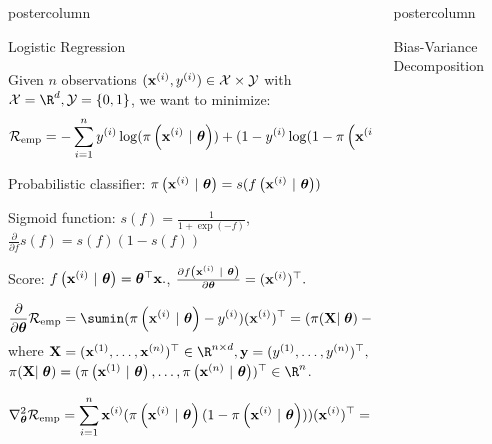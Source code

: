 \documentclass{beamer}
\newlength{\columnheight} %
\begin{document}
\begin{frame}[fragile]{}
\begin{columns}
	\begin{column}{.31\textwidth}
		\begin{beamercolorbox}[center]{postercolumn}
			\begin{minipage}{.98\textwidth}
				\parbox[t][\columnheight]{\textwidth}{

       \begin{myblock}{Logistic Regression}

Given $n$ observations $(\mathbf{x}^{(i)}, y^{(i)}) \in \mathcal{X} \times \mathcal{Y}$ with  $\Xspace = \R^d, \Yspace = \{0, 1\}$, 
we want to minimize:
$$ \mathcal{R}_{\text{emp}} = -\sum^n_{i=1} y^{(i)}\log(\pi\left(\mathbf{x}^{(i)} ~|~ \bm{\theta}\right)) + (1-y^{(i)}\log(1-\pi\left(\mathbf{x}^{(i)} ~|~ \bm{\theta}\right)))$$

Probabilistic classifier: $\pi\left(\mathbf{x}^{(i)} ~|~ \bm{\theta}\right) = s(f\left(\mathbf{x}^{(i)} ~|~ \bm{\theta}\right))$

Sigmoid function: $s(f) = \frac{1}{1 + \exp(-f)}$, $\frac{\partial}{\partial f} s(f) = s(f)(1-s(f))$

Score: $f\left(\mathbf{x}^{(i)} ~|~ \bm{\theta}\right) = \bm{\theta}^\top \mathbf{x}.$, $\frac{\partial f\left(\mathbf{x}^{(i)} ~|~ \bm{\theta}\right)}{\partial \bm{\theta}} = (\mathbf{x}^{(i)})^\top.$

$$\frac{\partial}{\partial\thetav}\riske = \sumin (\pixit - \yi)(\xi)^\top = (\pi(\mathbf{X}\vert\;\thetav) - \mathbf{y})^\top\mathbf{X}$$
where  $\mathbf{X} = (
    \xi[1], \dots, 
    \xi[n])^\top \in \R^{n\times d}, \mathbf{y} = (
    \yi[1], \dots,
    \yi[n]
)^\top,$ \\ $\pi(\mathbf{X}\vert\;\thetav) = (
    \pixit[1], \dots,
    \pixit[n]
)^\top \in \R^{n}$.


$$\nabla^2_{\bm{\theta}}\mathcal{R}_{\text{emp}} = \sum^n_{i=1}\mathbf{x}^{(i)} (\pi\left(\mathbf{x}^{(i)} ~|~ \bm{\theta}\right)(1-\pi\left(\mathbf{x}^{(i)} ~|~ \bm{\theta}\right)))(\mathbf{x}^{(i)})^\top = \mathbf{X}^\top \mathbf{D} \mathbf{X}$$

\end{myblock}

						}
					
			\end{minipage}
		\end{beamercolorbox}
	\end{column}
	

\begin{column}{.31\textwidth}
\begin{beamercolorbox}[center]{postercolumn}
\begin{minipage}{.98\textwidth}
\parbox[t][\columnheight]{\textwidth}{


\begin{myblock}{Bias-Variance Decomposition}


\end{myblock}}
\end{minipage}
\end{beamercolorbox}
\end{column}
\end{columns}
\end{frame}
\end{document}

